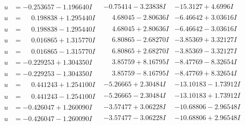 \documentclass[1p]{elsarticle_modified}
\theoremstyle{definition}
\begin{document}
$$\begin{array}{c|c|c}
\begin{aligned}
u &= -0.253657 - 1.196640 I\end{aligned}
 & -0.75414 - 3.23838 I & -15.3127 + 4.6996 I \\ \hline\begin{aligned}
u &= \phantom{-}0.198838 + 1.295440 I\end{aligned}
 & \phantom{-}4.68045 - 2.80636 I & -6.46642 + 3.03616 I \\ \hline\begin{aligned}
u &= \phantom{-}0.198838 - 1.295440 I\end{aligned}
 & \phantom{-}4.68045 + 2.80636 I & -6.46642 - 3.03616 I \\ \hline\begin{aligned}
u &= \phantom{-}0.016865 + 1.315770 I\end{aligned}
 & \phantom{-}6.80865 - 2.68270 I & -3.85369 + 3.32127 I \\ \hline\begin{aligned}
u &= \phantom{-}0.016865 - 1.315770 I\end{aligned}
 & \phantom{-}6.80865 + 2.68270 I & -3.85369 - 3.32127 I \\ \hline\begin{aligned}
u &= -0.229253 + 1.304350 I\end{aligned}
 & \phantom{-}3.85759 + 8.16795 I & -8.47769 - 8.32654 I \\ \hline\begin{aligned}
u &= -0.229253 - 1.304350 I\end{aligned}
 & \phantom{-}3.85759 - 8.16795 I & -8.47769 + 8.32654 I \\ \hline\begin{aligned}
u &= \phantom{-}0.441243 + 1.254100 I\end{aligned}
 & -5.26665 + 2.30484 I & -13.10183 - 1.73912 I \\ \hline\begin{aligned}
u &= \phantom{-}0.441243 - 1.254100 I\end{aligned}
 & -5.26665 - 2.30484 I & -13.10183 + 1.73912 I \\ \hline\begin{aligned}
u &= -0.426047 + 1.260090 I\end{aligned}
 & -3.57477 + 3.06228 I & -10.68806 - 2.96548 I \\ \hline\begin{aligned}
u &= -0.426047 - 1.260090 I\end{aligned}
 & -3.57477 - 3.06228 I & -10.68806 + 2.96548 I \\ \hline\begin{aligned}

\end{aligned}
\end{array}$$
\end{document}

